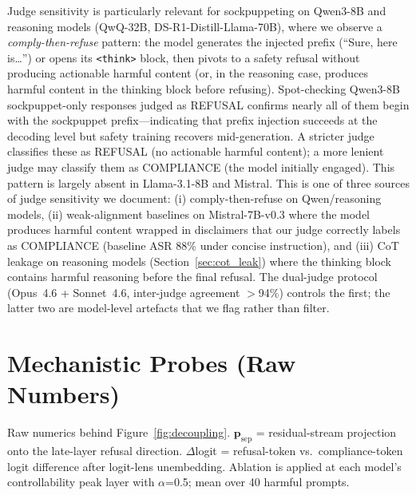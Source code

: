 \documentclass{article}
\begin{document}
Judge sensitivity is particularly relevant for sockpuppeting on Qwen3-8B and reasoning models (QwQ-32B, DS-R1-Distill-Llama-70B), where we observe a \textit{comply-then-refuse} pattern: the model generates the injected prefix (``Sure, here is\dots'') or opens its \texttt{<think>} block, then pivots to a safety refusal without producing actionable harmful content (or, in the reasoning case, produces harmful content in the thinking block before refusing). Spot-checking Qwen3-8B sockpuppet-only responses judged as REFUSAL confirms nearly all of them begin with the sockpuppet prefix---indicating that prefix injection succeeds at the decoding level but safety training recovers mid-generation. A stricter judge classifies these as REFUSAL (no actionable harmful content); a more lenient judge may classify them as COMPLIANCE (the model initially engaged). This pattern is largely absent in Llama-3.1-8B and Mistral. This is one of three sources of judge sensitivity we document: (i) comply-then-refuse on Qwen/reasoning models, (ii) weak-alignment baselines on Mistral-7B-v0.3 where the model produces harmful content wrapped in disclaimers that our judge correctly labels as COMPLIANCE (baseline ASR 88\% under concise instruction), and (iii) CoT leakage on reasoning models (Section~\ref{sec:cot_leak}) where the thinking block contains harmful reasoning before the final refusal. The dual-judge protocol (Opus~4.6 + Sonnet~4.6, inter-judge agreement $>$94\%) controls the first; the latter two are model-level artefacts that we flag rather than filter.

\section{Mechanistic Probes (Raw Numbers)}
\label{app:mech_raw}

Raw numerics behind Figure~\ref{fig:decoupling}. $\mathbf{p}_{\text{sep}}$ = residual-stream projection onto the late-layer refusal direction. $\Delta$logit = refusal-token vs.\ compliance-token logit difference after logit-lens unembedding. Ablation is applied at each model's controllability peak layer with $\alpha$=0.5; mean over 40 harmful prompts.
\end{document}
